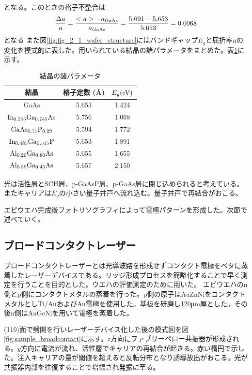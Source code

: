 となる。このときの格子不整合は
\begin{eqnarray}
\dfrac{\Delta a}{a}=\dfrac{<a> - a_{\rm{GaAs}}}{a_{\rm{GaAs}}}=\dfrac{5.691-5.653}{5.653}=0.0068
\end{eqnarray}
となる
また図\ref{fig:fig_2_1_wafer_structure}にはバンドギャップ$E_{g}$と屈折率nの変化を模式的に表した。用いられている結晶の諸パラメータをまとめた。表\ref{table:table_2_1_parameter}に示す。
\begin{table}[h]
  \caption{結晶の諸パラメータ}
    \label{table:table_2_1_parameter}
  \centering
  \begin{tabular}{ccc}
    \hline
      結晶&格子定数 (\AA) & $E_{g} (\rm{eV})$  \\
    \hline \hline
    GaAs  & 5.653&  1.424  \\
    $\rm{In_{0.255}Ga_{0.745}As}$&  5.756& 1.068  \\
    $\rm{GaAs_{0.71}P_{0.29}}$  &  5.594&1.772 \\
    $\rm{In_{0.485}Ga_{0.515}P}$& 5.653& 1.891\\
    $\rm{Al_{0.20}Ga_{0.80}As}$&5.655& 1.655\\
    $\rm{Al_{0.55}Ga_{0.45}As}$&5.657& 2.150\\
       \hline
  \end{tabular}
\end{table}

光は活性層とSCH層、p-GaAsP層、p-GaAs層に閉じ込められると考えている。またキャリアは$E_{g}$の小さい量子井戸へ流れ込む。量子井戸で再結合がおこる。

エピウエハ完成後フォトリソグラフィによって電極パターンを形成した。次節で述べていく。

\subsection{ブロードコンタクトレーザー}%
ブロードコンタクトレーザーとは光導波路を形成せずコンタクト電極をベタに蒸着したレーザーデバイスである。リッジ形成プロセスを簡略化することで早く測定を行うことを目的とした。ウエハの評価測定のために用いた。
エピウエハのn側とp側にコンタクトメタルの蒸着を行った。p側の原子はAuZnNiをコンタクトメタルとしTi/AuおよびAu電極を使用した。基板を研磨し120\si{\micro\metre}厚とした。その後n側はAuGeNiを用いて電極を蒸着した。


(110)面で劈開を行いレーザーデバイス化した後の模式図を図\ref{fig:sample_broadcontact}に示す。$z$方向にファブリーペロー共振器が形成される。$y$方向に電流が流れ、活性層でキャリアの再結合が起きる。赤い楕円で示した。注入キャリアの量が閾値を超えると反転分布となり誘導放出がおこる。光が共振器内部を往復することで増幅され発振に至る。

